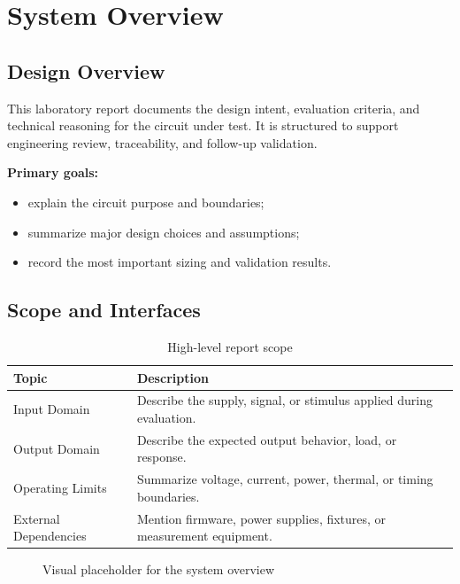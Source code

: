 \section{System Overview}

\subsection{Design Overview}
This laboratory report documents the design intent, evaluation criteria, and
technical reasoning for the circuit under test. It is structured to support
engineering review, traceability, and follow-up validation.

\textbf{Primary goals:}
\begin{itemize}
    \item explain the circuit purpose and boundaries;
    \item summarize major design choices and assumptions;
    \item record the most important sizing and validation results.
\end{itemize}


\subsection{Scope and Interfaces}
\begin{table}[H]
    \centering
    \small
    \begin{tabular}{l p{10cm}}
        \toprule
        \textbf{Topic} & \textbf{Description} \\
        \midrule
        Input Domain & Describe the supply, signal, or stimulus applied during evaluation. \\
        Output Domain & Describe the expected output behavior, load, or response. \\
        Operating Limits & Summarize voltage, current, power, thermal, or timing boundaries. \\
        External Dependencies & Mention firmware, power supplies, fixtures, or measurement equipment. \\
        \bottomrule
    \end{tabular}
    \caption{High-level report scope}
    \label{tab:scope}
\end{table}

\begin{figure}[H]
    \centering
    \caption{Visual placeholder for the system overview}
    \label{fig:overview}
\end{figure}

